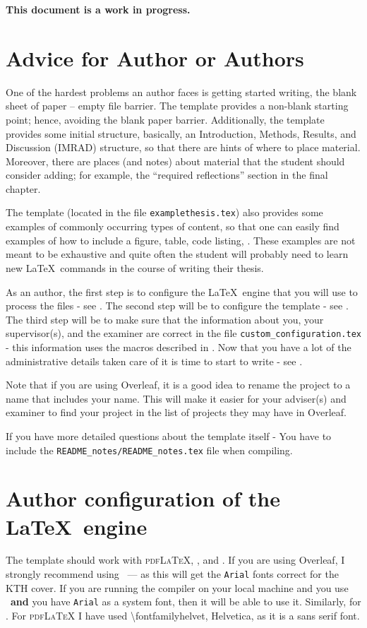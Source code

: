\documentclass[examplethesis.tex]{subfiles}
\begin{document}
\noindent\textbf{This document is a work in progress.}


\section{Advice for Author or Authors}
\label{sec:authors}
One of the hardest problems an author faces is getting started writing, \ie the blank sheet of paper -- empty file barrier. The template provides a \mbox{non-blank} starting point; hence, avoiding the blank paper barrier. Additionally, the template provides some initial structure, basically, an Introduction, Methods, Results, and Discussion (IMRAD) structure, so that there are hints of where to place material. Moreover, there are places (and notes) about material that the student should consider adding; for example, the ``required reflections'' section in the final chapter.

The template (located in the file \texttt{examplethesis.tex}) also provides some examples of commonly occurring types of content, so that one can easily find examples of how to include a figure, table, code listing, \etc. These examples are not meant to be exhaustive and quite often the student will probably need to learn new \LaTeX\  commands in the course of writing their thesis.

As an author, the first step is to configure the \LaTeX\  engine that you will use to process the files - see . The second step will be to configure the template - see . The third step will be to make sure that the information about you, your supervisor(s), and the examiner are correct in the file \texttt{custom\_configuration.tex} - this information uses the macros described in . Now that you have a lot of the administrative details taken care of it is time to start to write - see .

Note that if you are using Overleaf, it is a good idea to rename the project to a name that includes your name. This will make it easier for your adviser(s) and examiner to find your project in the list of projects they may have in Overleaf.


If you have more detailed questions about the template itself - 
{You have to include the \texttt{README\_notes/README\_notes.tex} file when compiling.}

\section{Author configuration of the \LaTeX\  engine}
\label{sec:latexEngine}
The template should work with \textsc{pdfLaTeX}, \XeLaTeX, and \LuaLaTeX.  If you are using Overleaf, I strongly recommend using \XeLaTeX\ ---  as this will get the \texttt{Arial} fonts correct for the KTH cover. If you are running the compiler on your local machine and you use \XeLaTeX\  \textbf{and} you have \texttt{Arial} as a system font, then it will be able to use it. Similarly, for \LuaLaTeX. For \textsc{pdfLaTeX} I have used \textbackslash fontfamily{helvet}, \ie Helvetica, as it is a sans serif font.
\end{document}
